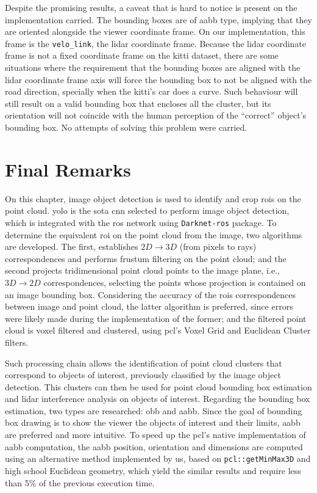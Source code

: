 Despite the promising results, a caveat that is hard to notice is present on the implementation carried. The bounding boxes are of \acl{aabb} type, implying that they are oriented alongside the viewer coordinate frame. On our implementation, this frame is the \texttt{velo\_link}, the \ac{lidar} coordinate frame. Because the \ac{lidar} coordinate frame is not a fixed coordinate frame on the \ac{kitti} dataset, there are some situations where the requirement that the bounding boxes are aligned with the \ac{lidar} coordinate frame axis will force the bounding box to not be aligned with the road direction, specially when the \ac{kitti}'s car does a curve. Such behaviour will still result on a valid bounding box that encloses all the cluster, but its orientation will not coincide with the human perception of the ``correct'' object's bounding box. No attempts of solving this problem were carried. 

\section{Final Remarks}
On this chapter, image object detection is used to identify and crop \aclp{roi} on the point cloud. \ac{yolo} is the \acl{sota} \acl{cnn} selected to perform image object detection, which is integrated with the \ac{ros} network using \texttt{Darknet-ros} package. To determine the equivalent \ac{roi} on the point cloud from the image, two algorithms are developed. The first, establishes $2D \rightarrow 3D$ (from pixels to rays) correspondences and performs frustum filtering on the point cloud; and the second projects tridimensional point cloud points to the image plane, i.e., $3D \rightarrow 2D$ correspondences, selecting the points whose projection is contained on an image bounding box. Considering the accuracy of the \acp{roi} correspondences between image and point cloud, the latter algorithm is preferred, since errors were likely made during the implementation of the former; and the filtered point cloud is voxel filtered and clustered, using \ac{pcl}'s Voxel Grid and Euclidean Cluster filters. 

Such processing chain allows the identification of point cloud clusters that correspond to objects of interest, previously classified by the image object detection. This clusters can then be used for point cloud bounding box estimation and \ac{lidar} interference analysis on objects of interest. Regarding the bounding box estimation, two types are researched: \acf{obb} and \acf{aabb}. Since the goal of bounding box drawing is to show the viewer the objects of interest and their limits, \ac{aabb} are preferred and more intuitive. To speed up the \ac{pcl}'s native implementation of \ac{aabb} computation, the \ac{aabb} position, orientation and dimensions are computed using an alternative method implemented by us, based on \texttt{pcl::getMinMax3D} and high school Euclidean geometry, which yield the similar results and require less than 5\% of the previous execution time.

